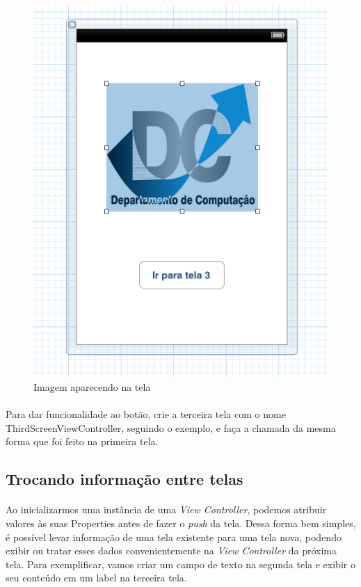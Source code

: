 \documentclass[a4paper,12pt,brazil,doubleside]{book}
\begin{document}
\begin{figure}[!h]
  \centering
  \includegraphics[totalheight=0.35\textheight]{../figuras/ios/2/xib2_tela2.png}
  \caption{Imagem aparecendo na tela}
  \label{fig:a}
\end{figure}

\bigskip

\paragraph{}Para dar funcionalidade ao botão, crie a terceira tela com o nome ThirdScreenViewController, seguindo o exemplo, e faça a chamada da mesma forma que foi feito na primeira tela.

\bigskip

\subsection{Trocando informação entre telas}

\paragraph{}Ao inicializarmos uma instância de uma \emph{View Controller}, podemos atribuir valores às suas Properties antes de fazer o \emph{push} da tela. Dessa forma bem simples, é possível levar informação de uma tela existente para uma tela nova, podendo exibir ou tratar esses dados convenientemente na \emph{View Controller} da próxima tela. Para exemplificar, vamos criar um campo de texto na segunda tela e exibir o seu conteúdo em um label na terceira tela.
\end{document}
